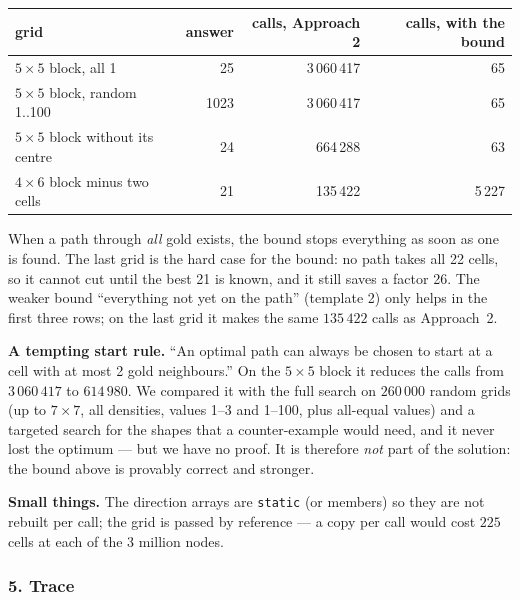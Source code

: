 \begin{tricksbox}
\begin{center}
\small
\renewcommand{\arraystretch}{1.2}
\begin{tabular}{@{}lrrr@{}}
\toprule
\textbf{grid} & \textbf{answer} & \textbf{calls, Approach 2} & \textbf{calls, with the bound} \\
\midrule
$5 \times 5$ block, all 1 & 25 & 3\,060\,417 & 65 \\
$5 \times 5$ block, random 1..100 & 1023 & 3\,060\,417 & 65 \\
$5 \times 5$ block without its centre & 24 & 664\,288 & 63 \\
$4 \times 6$ block minus two cells & 21 & 135\,422 & 5\,227 \\
\bottomrule
\end{tabular}
\end{center}
When a path through \emph{all} gold exists, the bound stops everything as soon as one is found. The last grid is the hard case for the bound: no path takes all 22 cells, so it cannot cut until the best 21 is known, and it still saves a factor 26. The weaker bound ``everything not yet on the path'' (template 2) only helps in the first three rows; on the last grid it makes the same $135\,422$ calls as Approach~2.

\textbf{A tempting start rule.} ``An optimal path can always be chosen to start at a cell with at most 2 gold neighbours.'' On the $5 \times 5$ block it reduces the calls from $3\,060\,417$ to $614\,980$. We compared it with the full search on $260\,000$ random grids (up to $7 \times 7$, all densities, values 1--3 and 1--100, plus all-equal values) and a targeted search for the shapes that a counter-example would need, and it never lost the optimum --- but we have no proof. It is therefore \emph{not} part of the solution: the bound above is provably correct and stronger.

\textbf{Small things.} The direction arrays are \texttt{static} (or members) so they are not rebuilt per call; the grid is passed by reference --- a copy per call would cost $225$ cells at each of the 3 million nodes.
\end{tricksbox}

\subsubsection*{5. Trace}


